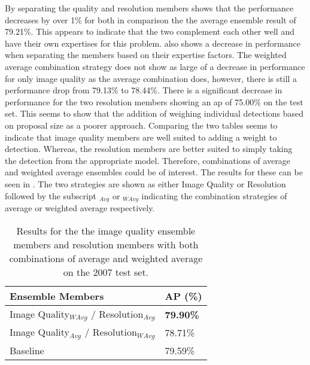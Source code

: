 \documentclass[a4paper,twoside]{article}
\begin{document}
By separating the quality and resolution members  shows that the performance decreases by over 1\% for both in comparison the the average ensemble result of 79.21\%. This appears to indicate that the two complement each other well and have their own expertises for this problem.  also shows a decrease in performance when separating the members based on their expertise factors. The weighted average combination strategy does not show as large of a decrease in performance for only image quality as the average combination does, however, there is still a performance drop from 79.13\% to 78.44\%. There is a significant decrease in performance for the two resolution members showing an \gls{ap} of 75.00\% on the test set. This seems to show that the addition of weighing individual detections based on proposal size as a poorer approach. Comparing the two tables seems to indicate that image quality members are well suited to adding a weight to detection. Whereas, the resolution members are better suited to simply taking the detection from the appropriate model. Therefore, combinations of average and weighted average ensembles could be of interest. The results for these can be seen in . The two strategies are shown as either Image Quality or Resolution followed by the subscript $_{Avg}$ or $_{WAvg}$ indicating the combination strategies of average or weighted average respectively. 

\begin{table}[h]
\centering
\caption{Results for the the image quality ensemble members and resolution members with both combinations of average and weighted average on the 2007 test set.}
\label{tab:weandavgres}
\begin{tabular}{|l|l|}
\hline
\textbf{Ensemble Members}                  & \textbf{AP (\%)} \\ \hline
Image Quality$_{WAvg}$ / Resolution$_{Avg}$ & \textbf{79.90\%} \\ \hline
Image Quality$_{Avg}$ / Resolution$_{WAvg}$ & 78.71\% \\ \hline
Baseline                          & 79.59\% \\ \hline
\end{tabular}
\end{table}
\end{document}
